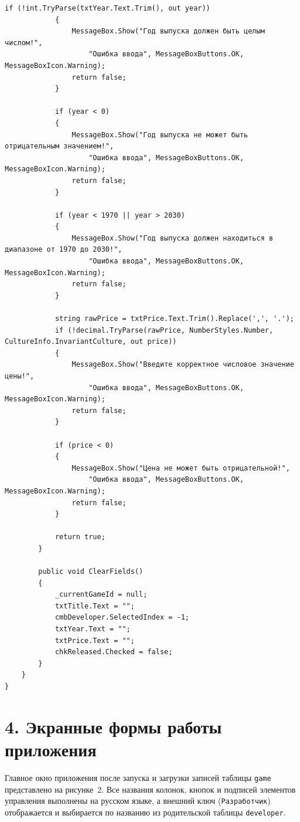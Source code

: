 \documentclass[oneside,a4paper,14pt]{extarticle}
\begin{document}
\begin{lstlisting}[language={[Sharp]C}]
            if (!int.TryParse(txtYear.Text.Trim(), out year))
            {
                MessageBox.Show("Год выпуска должен быть целым числом!",
                    "Ошибка ввода", MessageBoxButtons.OK, MessageBoxIcon.Warning);
                return false;
            }

            if (year < 0)
            {
                MessageBox.Show("Год выпуска не может быть отрицательным значением!",
                    "Ошибка ввода", MessageBoxButtons.OK, MessageBoxIcon.Warning);
                return false;
            }

            if (year < 1970 || year > 2030)
            {
                MessageBox.Show("Год выпуска должен находиться в диапазоне от 1970 до 2030!",
                    "Ошибка ввода", MessageBoxButtons.OK, MessageBoxIcon.Warning);
                return false;
            }

            string rawPrice = txtPrice.Text.Trim().Replace(',', '.');
            if (!decimal.TryParse(rawPrice, NumberStyles.Number, CultureInfo.InvariantCulture, out price))
            {
                MessageBox.Show("Введите корректное числовое значение цены!",
                    "Ошибка ввода", MessageBoxButtons.OK, MessageBoxIcon.Warning);
                return false;
            }

            if (price < 0)
            {
                MessageBox.Show("Цена не может быть отрицательной!",
                    "Ошибка ввода", MessageBoxButtons.OK, MessageBoxIcon.Warning);
                return false;
            }

            return true;
        }

        public void ClearFields()
        {
            _currentGameId = null;
            txtTitle.Text = "";
            cmbDeveloper.SelectedIndex = -1;
            txtYear.Text = "";
            txtPrice.Text = "";
            chkReleased.Checked = false;
        }
    }
}
	\end{lstlisting}
	
	\newpage
	
	\section*{4. Экранные формы работы приложения}
	
	Главное окно приложения после запуска и загрузки записей таблицы \texttt{game} представлено на рисунке~2. Все названия колонок, кнопок и подписей элементов управления выполнены на русском языке, а внешний ключ (\texttt{Разработчик}) отображается и выбирается по названию из родительской таблицы \texttt{developer}.
	
\end{document}
